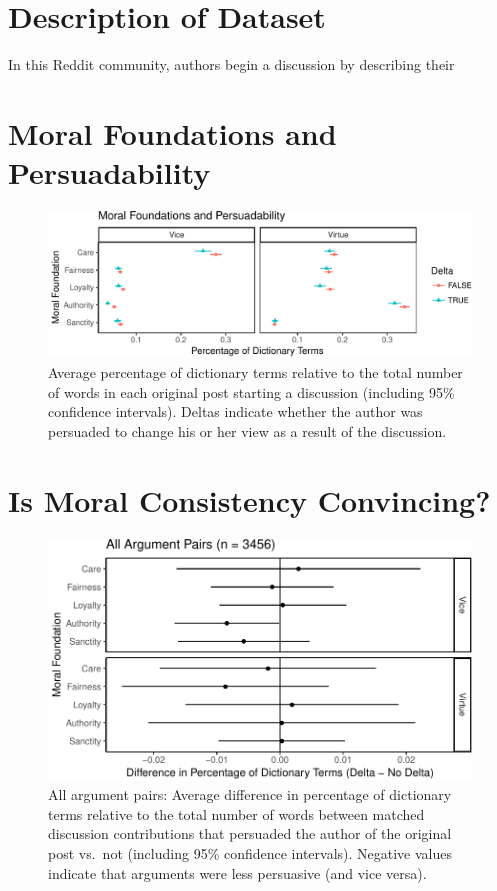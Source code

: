 \documentclass[12pt,]{article}
\begin{document}
\section{Description of Dataset}\label{description-of-dataset}

In this Reddit community, authors begin a discussion by describing their

\section{Moral Foundations and
Persuadability}\label{moral-foundations-and-persuadability}

\begin{figure}
\centering
\includegraphics{prelim_files/figure-latex/examine op data-1.pdf}
\caption{Average percentage of dictionary terms relative to the total
number of words in each original post starting a discussion (including
95\% confidence intervals). Deltas indicate whether the author was
persuaded to change his or her view as a result of the discussion.}
\end{figure}

\section{Is Moral Consistency
Convincing?}\label{is-moral-consistency-convincing}

\begin{figure}
\centering
\includegraphics{prelim_files/figure-latex/check all discussion pairs-1.pdf}
\caption{All argument pairs: Average difference in percentage of
dictionary terms relative to the total number of words between matched
discussion contributions that persuaded the author of the original post
vs.~not (including 95\% confidence intervals). Negative values indicate
that arguments were less persuasive (and vice versa).}
\end{figure}
\end{document}
